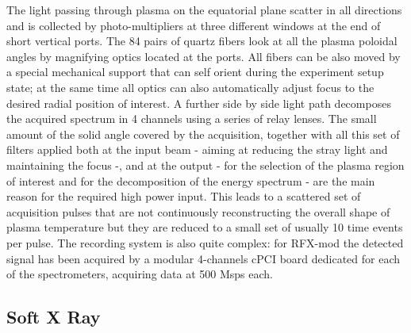 The light passing through plasma on the equatorial plane scatter in all directions and is collected by photo-multipliers at three different windows at the end of short vertical ports. The 84 pairs of quartz fibers look at all the plasma poloidal angles by magnifying optics located at the ports. All fibers can be also moved by a special mechanical support that can self orient during the experiment setup state; at the same time all optics can also automatically adjust focus to the desired radial position of interest.
A further side by side light path decomposes the acquired spectrum in 4 channels using a series of relay lenses.
%
The small amount of the solid angle covered by the acquisition, together with all this set of filters applied both at the input beam - aiming at reducing the stray light and maintaining the focus -, and at the output - for the selection of the plasma region of interest and for the decomposition of the energy spectrum - are the main reason for the required high power input.
%
This leads to a scattered set of acquisition pulses that are not continuously reconstructing the overall shape of plasma temperature but they are reduced to a small set of usually 10 time events per pulse.
%
The recording system is also quite complex: for RFX-mod the detected signal has been acquired by a modular 4-channels cPCI board dedicated for each of the spectrometers, acquiring data at 500 Msps each.

\subsection{Soft X Ray}

